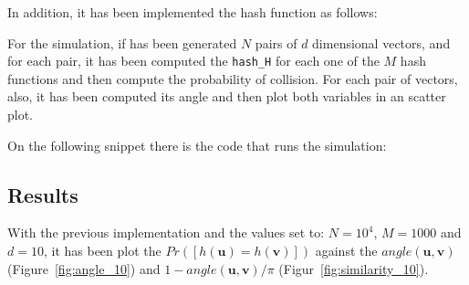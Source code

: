 \documentclass{ethz_report}
\begin{document}
In addition, it has been implemented the hash function as follows:



For the simulation, if has been generated $N$ pairs of $d$ dimensional vectors, and for each pair, it has been computed the \texttt{hash\_H} for each one of the $M$ hash functions and then compute the probability of collision. For each pair of vectors, also, it has been computed its angle and then plot both variables in an scatter plot.

On the following snippet there is the code that runs the simulation:



\subsection*{Results}

With the previous implementation and the values set to: $N = 10^4$, $M = 1000$ and $d = 10$,
it has been plot the $Pr([h(\mathbf{u})=h(\mathbf{v})])$ against the $angle(\mathbf{u}, \mathbf{v})$ (Figure~\ref{fig:angle_10}) and $1 - angle(\mathbf{u}, \mathbf{v}) / \pi$ (Figur~\ref{fig:similarity_10}).
\end{document}
